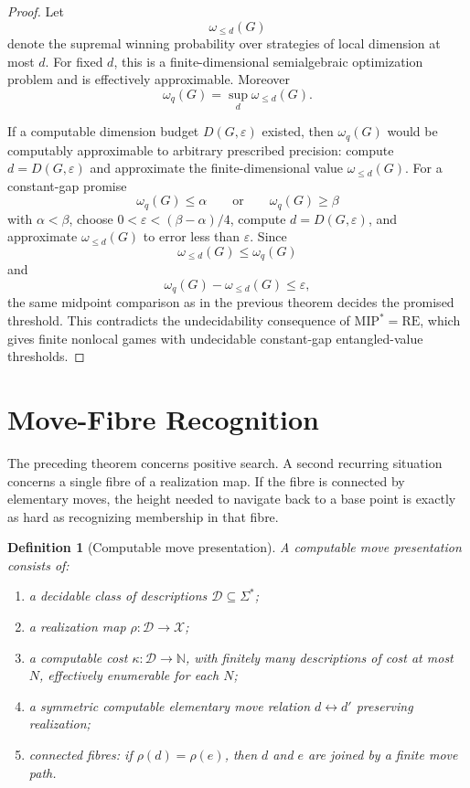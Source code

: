 \documentclass[11pt]{article}
\newtheorem{definition}[theorem]{Definition}
\begin{document}
\begin{proof}
Let
\[
\omega_{\leq d}(G)
\]
denote the supremal winning probability over strategies of local dimension at most \(d\). For fixed \(d\), this is a finite-dimensional semialgebraic optimization problem and is effectively approximable. Moreover
\[
\omega_q(G)=\sup_d\omega_{\leq d}(G).
\]

If a computable dimension budget \(D(G,\varepsilon)\) existed, then \(\omega_q(G)\) would be computably approximable to arbitrary prescribed precision: compute \(d=D(G,\varepsilon)\) and approximate the finite-dimensional value \(\omega_{\leq d}(G)\). For a constant-gap promise
\[
\omega_q(G)\leq\alpha
\qquad\text{or}\qquad
\omega_q(G)\geq\beta
\]
with \(\alpha<\beta\), choose \(0<\varepsilon<(\beta-\alpha)/4\), compute \(d=D(G,\varepsilon)\), and approximate \(\omega_{\leq d}(G)\) to error less than \(\varepsilon\). Since
\[
\omega_{\leq d}(G)\leq \omega_q(G)
\]
and
\[
\omega_q(G)-\omega_{\leq d}(G)\leq\varepsilon,
\]
the same midpoint comparison as in the previous theorem decides the promised threshold. This contradicts the undecidability consequence of \( \mathrm{MIP}^{\ast}=\mathrm{RE}\), which gives finite nonlocal games with undecidable constant-gap entangled-value thresholds.
\end{proof}

\section{Move-Fibre Recognition}

The preceding theorem concerns positive search. A second recurring situation concerns a single fibre of a realization map. If the fibre is connected by elementary moves, the height needed to navigate back to a base point is exactly as hard as recognizing membership in that fibre.

\begin{definition}[Computable move presentation]
A computable move presentation consists of:
\begin{enumerate}[label=(\roman*)]
\item a decidable class of descriptions \(\mathcal D\subseteq\Sigma^\ast\);
\item a realization map \(\rho:\mathcal D\to\mathcal X\);
\item a computable cost \(\kappa:\mathcal D\to\mathbb N\), with finitely many descriptions of cost at most \(N\), effectively enumerable for each \(N\);
\item a symmetric computable elementary move relation \(d\leftrightarrow d'\) preserving realization;
\item connected fibres: if \(\rho(d)=\rho(e)\), then \(d\) and \(e\) are joined by a finite move path.
\end{enumerate}
\end{definition}
\end{document}
